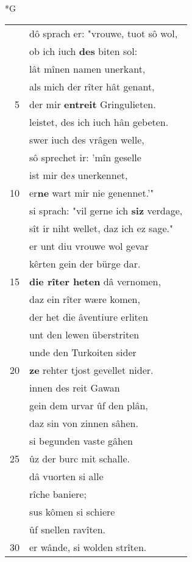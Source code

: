 \documentclass[8pt,a4paper,notitlepage]{article}
\begin{document}
\begin{table}[ht]
\begin{minipage}[t]{0.5\linewidth}
\small
\begin{center}*G
\end{center}
\begin{tabular}{rl}
 & dô sprach er: "vrouwe, tuot sô wol,\\ 
 & ob ich iuch \textbf{des} biten sol:\\ 
 & lât mînen namen unerkant,\\ 
 & als mich der rîter hât genant,\\ 
5 & der mir \textbf{entreit} Gringulieten.\\ 
 & leistet, des ich iuch hân gebeten.\\ 
 & swer iuch des vrâgen welle,\\ 
 & sô sprechet ir: 'mîn geselle\\ 
 & ist mir de\textit{s} unerkennet,\\ 
10 & er\textbf{ne} wart mir nie genennet.'"\\ 
 & si sprach: "vil gerne ich \textbf{si}\textbf{z} verdage,\\ 
 & sît ir niht wellet, daz ich ez sage."\\ 
 & er unt diu vrouwe wol gevar\\ 
 & kêrten gein der bürge dar.\\ 
15 & \textbf{die rîter heten} dâ vernomen,\\ 
 & daz ein rîter wære komen,\\ 
 & der het die âventiure erliten\\ 
 & unt den lewen überstriten\\ 
 & unde den Turkoiten sider\\ 
20 & \textbf{ze} rehter tjost gevellet nider.\\ 
 & innen des reit Gawan\\ 
 & gein dem urvar ûf den plân,\\ 
 & daz sin von zinnen sâhen.\\ 
 & si begunden vaste gâhen\\ 
25 & ûz der burc mit schalle.\\ 
 & dâ vuorten si alle\\ 
 & rîche baniere;\\ 
 & sus kômen si schiere\\ 
 & ûf snellen ravîten.\\ 
30 & er wânde, si wolden strîten.\\ 
\end{tabular}

\end{minipage}
\end{table}
\end{document}
